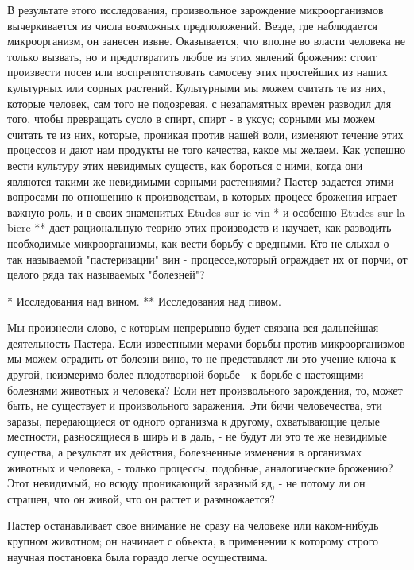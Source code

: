 В результате этого исследования, произвольное зарождение микроорганизмов
вычеркивается из числа возможных  предположений. Везде, где  наблюдается
микроорганизм, он  занесен  извне.  Оказывается, что  вполне  во  власти
человека не только  вызвать, но  и предотвратить любое  из этих  явлений
брожения: стоит  произвести посев  или воспрепятствовать  самосеву  этих
простейших из наших культурных или сорных растений. Культурными мы можем
считать  те  из  них,  которые  человек,  сам  того  не  подозревая,   с
незапамятных времен разводил для того,  чтобы превращать сусло в  спирт,
спирт - в уксус; сорными мы  можем считать те из них, которые,  проникая
против нашей воли, изменяют течение  этих процессов и дают нам  продукты
не того  качества, какое  мы  желаем. Как  успешно вести  культуру  этих
невидимых существ, как  бороться с  ними, когда они  являются такими  же
невидимыми  сорными  растениями?  Пастер  задается  этими  вопросами  по
отношению к  производствам, в  которых  процесс брожения  играет  важную
роль, и в своих знаменитых Etudes sur ie vin * и особенно Etudes sur  la
biere **  дает  рациональную  теорию этих  производств  и  научает,  как
разводить необходимые микроорганизмы, как  вести борьбу с вредными.  Кто
не  слыхал  о  так  называемой  "пастеризации"  вин  -  процессе,который
ограждает их от порчи, от целого ряда так называемых "болезней"?

* Исследования над вином.
** Исследования над пивом.

Мы произнесли слово, с которым  непрерывно будет связана вся  дальнейшая
деятельность   Пастера.   Если    известными   мерами   борьбы    против
микроорганизмов мы можем оградить от болезни вино, то не представляет ли
это учение  ключа к  другой, неизмеримо  более плодотворной  борьбе -  к
борьбе  с   настоящими  болезнями   животных   и  человека?   Если   нет
произвольного зарождения, то, может быть, не существует и  произвольного
заражения. Эти  бичи человечества,  эти заразы,  передающиеся от  одного
организма к другому, охватывающие целые местности, разносящиеся в ширь и
в даль, -  не будут  ли это  те же  невидимые существа,  а результат  их
действия, болезненные  изменения в  организмах  животных и  человека,  -
только процессы, подобные,  аналогические брожению?  Этот невидимый,  но
всюду проникающий заразный яд, - не потому ли он страшен, что он  живой,
что он растет и размножается?

Пастер останавливает свое внимание не сразу на человеке или каком-нибудь
крупном животном; он начинает с объекта, в применении к которому  строго
научная постановка была гораздо легче осуществима.

